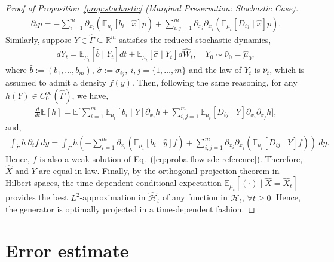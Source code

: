 \documentclass[11pt, a4paper, oneside, reqno]{amsart}
\begin{document}
\begin{proof}[Proof of Proposition~\ref{prop:stochastic} (Marginal Preservation: Stochastic Case)]
    \begin{eqnarray}\label{eq:proba flow sde reference}
        \partial_tp=- \sum_{i=1}^m\partial_{x_i}(\mathbb{E}_{\mu_t}[b_i\mid \hat{x}] p)+\sum_{i,j=1}^m \partial_{x_i}\partial_{x_j}(\mathbb{E}_{\mu_t}[D_{ij}\mid \hat{x}]p).
    \end{eqnarray}
    Similarly, suppose $Y\in\hat{\Gamma}\subseteq\mathbb{R}^m$ satisfies the reduced stochastic dynamics,
    \begin{eqnarray}
        dY_t=\mathbb{E}_{\mu_t}[\hat{b}\mid  Y_t]dt + \mathbb{E}_{\mu_t}[\hat{\sigma}\mid Y_t]d\hat{W}_t, \quad Y_0\sim \hat{\nu}_0 = \hat{\mu}_0,
    \end{eqnarray}
    where $\hat{b}:=(b_1,\dots,b_m)$, $\hat{\sigma}:=\sigma_{ij}, \ i,j=\{1,\dots,m\}$ and the law of $Y_t$ is $\hat{\nu}_t$, which is assumed to admit a density $f(y)$. Then, following the same reasoning, for any $h(Y)\in C_0^\infty(\hat{\Gamma})$, we have,
    \begin{eqnarray}
        \frac{d}{dt}\mathbb{E}[h] = \mathbb{E}\bigg[\sum_{i=1}^m \mathbb{E}_{\mu_t}[b_i\mid Y]\partial_{x_i}h + \sum_{i,j=1}^m\mathbb{E}_{\mu_t}[D_{ij}\mid Y]\partial_{x_i}\partial_{x_j} h  \bigg],
    \end{eqnarray}
    and,
    \begin{eqnarray}
         \int_{\hat{\Gamma}} h \ \partial_tf \ dy = \int_{\hat{\Gamma}} h \left(-\sum_{i=1}^m\partial_{x_i}(\mathbb{E}_{\mu_t}[b_i\mid \hat{y}] f) + \sum_{i,j=1}^m\partial_{x_i}\partial_{x_j}(\mathbb{E}_{\mu_t}[D_{ij}\mid Y] f) \right)\ dy.
    \end{eqnarray}
    Hence, $f$ is also a weak solution of Eq.~(\ref{eq:proba flow sde reference}).
    Therefore, $\hat{X}$ and $Y$ are equal in law.
    Finally, by the orthogonal projection theorem in Hilbert spaces, the time-dependent conditional expectation $\mathbb{E}_{\mu_t}[(\cdot)\mid\hat{X}=\hat{X}_t]$ provides the best $L^2$-approximation in $\hat{\mathcal{H}}_t$ of any function in $\mathcal{H}_t$, $\forall t \geq 0$. Hence, the generator is optimally projected in a time-dependent fashion.
\end{proof}
\section{Error estimate}\label{app:error}
\end{document}
